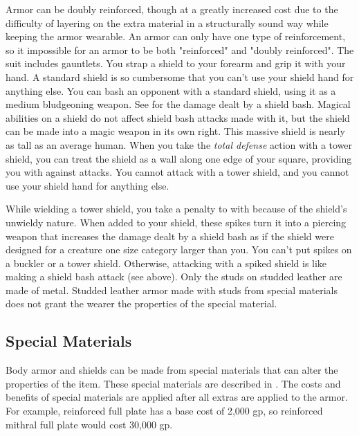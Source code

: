        Armor can be doubly reinforced, though at a greatly increased cost due to the difficulty of layering on the extra material in a structurally sound way while keeping the armor wearable.
        An armor can only have one type of reinforcement, so it impossible for an armor to be both "reinforced" and "doubly reinforced".
         The suit includes gauntlets.
         You strap a shield to your forearm and grip it with your hand. A standard shield is so cumbersome that you can't use your shield hand for anything else.
         You can bash an opponent with a standard shield, using it as a medium bludgeoning weapon. See  for the damage dealt by a shield bash.
        Magical abilities on a shield do not affect shield bash attacks made with it, but the shield can be made into a magic weapon in its own right.
         This massive shield is nearly as tall as an average human.
        When you take the \textit{total defense} action with a tower shield, you can treat the shield as a wall along one edge of your square, providing you with  against attacks.
        You cannot attack with a tower shield, and you cannot use your shield hand for anything else.

        While wielding a tower shield, you take a  penalty to  with  because of the shield's unwieldy nature.
         When added to your shield, these spikes turn it into a piercing weapon that increases the damage dealt by a shield bash as if the shield were designed for a creature one size category larger than you. You can't put spikes on a buckler or a tower shield. Otherwise, attacking with a spiked shield is like making a shield bash attack (see above).
         Only the studs on studded leather are made of metal.
        Studded leather armor made with studs from special materials does not grant the wearer the properties of the special material.

    \subsection{Special Materials}
        Body armor and shields can be made from special materials that can alter the properties of the item.
        These special materials are described in .
        The costs and benefits of special materials are applied after all extras are applied to the armor.
        For example, reinforced full plate has a base cost of 2,000 gp, so reinforced mithral full plate would cost 30,000 gp.

